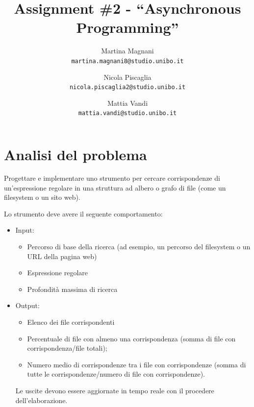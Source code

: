 \documentclass[a4paper]{article}
\title{\LARGE \bf
Assignment \#2 - ``Asynchronous Programming''
}
\author{
    Martina Magnani\\
    \texttt{martina.magnani8@studio.unibo.it}
    \and
    Nicola Piscaglia\\
    \texttt{nicola.piscaglia2@studio.unibo.it}
    \and
    Mattia Vandi\\
    \texttt{mattia.vandi@studio.unibo.it}
}
\date{}
\begin{document}
\maketitle
\section{Analisi del problema}\label{analisi-del-problema}

Progettare e implementare uno strumento per cercare corrispondenze di un'espressione regolare in una struttura ad albero o grafo di file (come un filesystem o un sito web).

Lo strumento deve avere il seguente comportamento:

\begin{itemize}

    \item Input\label{input}:

        \begin{itemize}

            \item Percorso di base della ricerca (ad esempio, un percorso del filesystem o un URL della pagina web)

            \item Espressione regolare

            \item Profondit\`a massima di ricerca

        \end{itemize}

    \item Output\label{output}:

        \begin{itemize}

            \item Elenco dei file corrispondenti

            \item Percentuale di file con almeno una corrispondenza (somma di file con corrispondenza/file totali);

            \item Numero medio di corrispondenze tra i file con corrispondenze (somma di tutte le corrispondenze/numero di file con corrispondenze).

        \end{itemize}

        Le uscite devono essere aggiornate in tempo reale con il procedere dell'elaborazione.

\end{itemize}
\end{document}

